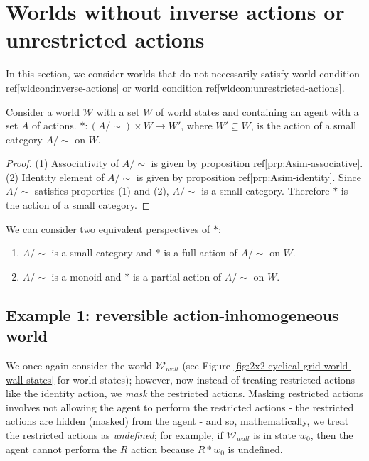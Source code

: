 \section{Worlds without inverse actions or unrestricted actions}\label{sec:Worlds without inverse actions or unrestricted actions}

In this section, we consider worlds that do not necessarily satisfy world condition ref[wldcon:inverse-actions] or world condition ref[wldcon:unrestricted-actions].

\begin{proposition}\label{prp:all_worlds_give_small_category_action}
    Consider a world $\mathscr{W}$ with a set $W$ of world states and containing an agent with a set $A$ of actions.
    $*: (A/\sim) \times W \to W'$, where $W' \subseteq W$, is the action of a small category $A/\sim$ on $W$.
\end{proposition}
\begin{proof}
    (1) Associativity of $A/\sim$ is given by proposition ref[prp:Asim-associative].
    (2) Identity element of $A/\sim$ is given by proposition ref[prp:Asim-identity].
    Since $A/\sim$ satisfies properties (1) and (2), $A/\sim$ is a small category.
    Therefore $*$ is the action of a small category.
\end{proof}

\begin{remark}
    We can consider two equivalent perspectives of $*$:
    \begin{enumerate}
        \item $A/\sim$ is a small category and $*$ is a full action of $A/\sim$ on $W$.
        \item $A/\sim$ is a monoid and $*$ is a partial action of $A/\sim$ on $W$.
    \end{enumerate}
\end{remark}

\subsection{Example 1: reversible action-inhomogeneous world}\label{sec:masked reversible action-inhomogeneous world}

We once again consider the world $\mathscr{W}_{wall}$ (see Figure \ref{fig:2x2-cyclical-grid-world-wall-states} for world states); however, now instead of treating restricted actions like the identity action, we \textit{mask} the restricted actions.
Masking restricted actions involves not allowing the agent to perform the restricted actions - the restricted actions are hidden (masked) from the agent - and so, mathematically, we treat the restricted actions as \textit{undefined}; for example, if $\mathscr{W}_{wall}$ is in state $w_{0}$, then the agent cannot perform the $R$ action because $R * w_{0}$ is undefined.





